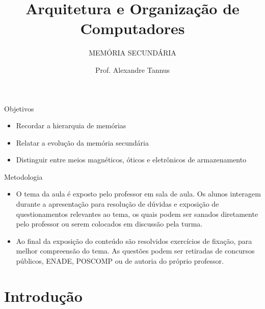 \documentclass[aspectratio=169,
				xcolor=table]{beamer}
\institute[]{\uppercase{Engenharia de Software}}
\title[]{Arquitetura e Organização de Computadores}
\subtitle[]{\uppercase{Memória Secundária}}
\author[]{Prof. Alexandre Tannus}
\date{}
\begin{document}

	\begin{frame}
		\titlepage
	\end{frame}
	
	\begin{frame}{Objetivos}
		\begin{itemize}
			\item Recordar a hierarquia de memórias
			\vspace{1em}
			\item Relatar a evolução da memória secundária
			\vspace{1em} 
			\item Distinguir entre meios magnéticos, óticos e eletrônicos de armazenamento
		\end{itemize}
	\end{frame}

	\begin{frame}{Metodologia}
		\begin{itemize}
			\item O tema da aula é exposto pelo professor em sala de aula. Os alunos interagem durante a apresentação para resolução de dúvidas e exposição de questionamentos relevantes ao tema, os quais podem ser sanados diretamente pelo professor ou serem colocados em discussão pela turma. 
			\vspace{1em}
			\item Ao final da exposição do conteúdo são resolvidos exercícios de fixação, para melhor compreensão do tema. As questões podem ser retiradas de concursos públicos, ENADE, POSCOMP ou de autoria do próprio professor.
		\end{itemize}
	\end{frame}

	\begin{frame}
		\tableofcontents		
	\end{frame}	
	
	\section{Introdução}
	
\end{document}
